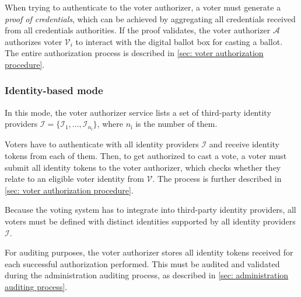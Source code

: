 When trying to authenticate to the voter authorizer, a voter must generate a \textit{proof of credentials}, which can be achieved by aggregating all credentials received from all credentials authorities. If the proof validates, the voter authorizer $\mathcal{A}$ authorizes voter $\mathcal{V}_i$ to interact with the digital ballot box for casting a ballot. The entire authorization process is described in \cref{sec: voter authorization procedure}.


\subsubsection{Identity-based mode} \label{sec: identity-based mode}
In this mode, the voter authorizer service lists a set of third-party identity providers $\boldsymbol{\mathcal{I}} = \{ \mathcal{I}_1, ..., \mathcal{I}_{n_\mathrm{i}} \}$, where $n_\mathrm{i}$ is the number of them.

Voters have to authenticate with all identity providers $\boldsymbol{\mathcal{I}}$ and receive identity tokens from each of them. Then, to get authorized to cast a vote, a voter must submit all identity tokens to the voter authorizer, which checks whether they relate to an eligible voter identity from $\boldsymbol{\mathcal{V}}$. The process is further described in \cref{sec: voter authorization procedure}.

Because the voting system has to integrate into third-party identity providers, all voters must be defined with distinct identities supported by all identity providers $\boldsymbol{\mathcal{I}}$.

For auditing purposes, the voter authorizer stores all identity tokens received for each successful authorization performed. This must be audited and validated during the administration auditing process, as described in \cref{sec: administration auditing process}.
